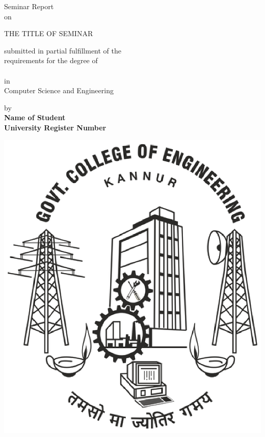 
\newcommand{\jadafont}[1]{{\fontfamily{pzc}\selectfont {\large #1}}}

\begin{titlepage}
\begin{center}

	{ \LARGE Seminar Report }\\\medskip
	{ on }\\\bigskip
	{\huge THE TITLE OF SEMINAR\par}	

\vspace{3cm}

	{\sc submitted in partial fulfillment of the \\ requirements for the degree of}\\\medskip
	\jadafont{Bachelor of Technology}\\\medskip
	{\sc in \\ Computer Science and Engineering} 

\vspace{1cm}

	{\sc by}\\\medskip
	{\bf Name of Student} \\ \medskip
	{\bf University Register Number}
	
\vspace{1cm}

\vspace{2cm}
      \vspace*{20pt}
        \centerline{\includegraphics [keepaspectratio=true, scale=.3]{gcek.eps}}



\end{center}
\end{titlepage}
